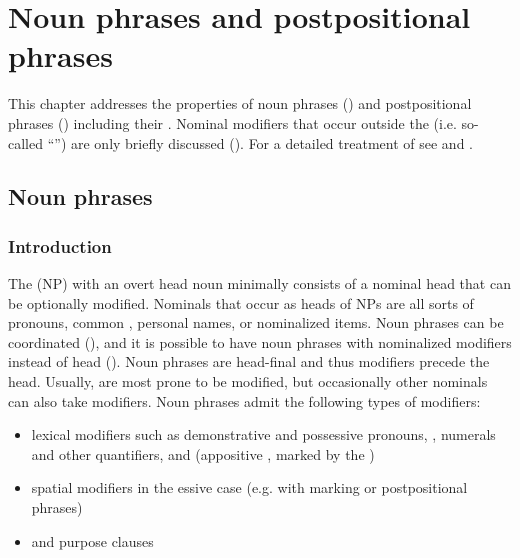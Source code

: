 \chapter{Noun phrases and postpositional phrases}
\label{cpt:Phrase structure}

This chapter addresses the properties of noun phrases () and postpositional phrases () including their . Nominal modifiers that occur outside the  (i.e. so-called ``'') are only briefly discussed (). For a detailed treatment of  see  and .


\section{Noun phrases}
\label{sec:Noun phrases}



\subsection{Introduction}
\label{ssec:IntroductionNP}

The  (NP) with an overt head noun minimally consists of a nominal head that can be optionally modified. Nominals that occur as heads of NPs are all sorts of pronouns, common , personal names, or nominalized items. Noun phrases can be coordinated (), and it is possible to have noun phrases with nominalized modifiers instead of head  (). Noun phrases are head-final and thus modifiers precede the head. Usually,  are most prone to be modified, but occasionally other nominals can also take modifiers. Noun phrases admit the following types of modifiers:
%
\begin{itemize}
	\item	lexical modifiers such as demonstrative and possessive pronouns, , numerals and other quantifiers, and  (appositive ,  marked by the )
	\item	spatial modifiers in the essive case (e.g.  with  marking or postpositional phrases)
	\item	{} and purpose clauses
\end{itemize}
%

